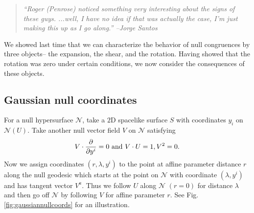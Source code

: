 \begin{quote}
    \textit{``Roger (Penrose) noticed something very interesting about the signs of these guys. ...well, I have no idea if that was actually the case, I'm just making this up as I go along.'' --Jorge Santos}
\end{quote}
We showed last time that we can characterize the behavior of null congruences by three objects-- the expansion, the shear, and the rotation. Having showed that the rotation was zero under certain conditions, we now consider the consequences of these objects.

\subsection*{Gaussian null coordinates} For a null hypersurface $\mathcal{N}$, take a $2$D spacelike surface $S$ with coordinates $y_i$ on $\mathcal{N}(U)$. Take another null vector field $V$ on $\mathcal{N}$ satisfying \begin{equation}
    V\cdot \P{}{y^i}=0\text{ and } V\cdot U=1, V^2=0.
\end{equation}
Now we assign coordinates $(r,\lambda,y^i)$ to the point at affine parameter distance $r$ along the null geodesic which starts at the point on $\mathcal{N}$ with coordinate $(\lambda,y^i)$ and has tangent vector $V^a$. Thus we follow $U$ along $\mathcal{N}$ $(r=0)$ for distance $\lambda$ and then go off $\mathcal{N}$ by following $V$ for affine parameter $r$. See Fig. \ref{fig:gaussiannullcoords} for an illustration.

